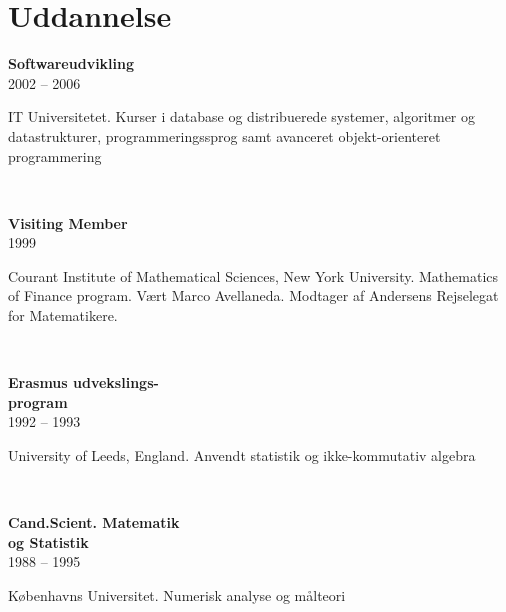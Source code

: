 \documentclass[10pt, a4paper]{article}
\begin{document}
\section{Uddannelse}
\begin{Row}%
  \begin{Cell}{1}
    \textbf{Softwareudvikling} \\[1ex]
    2002 -- 2006 %
  \end{Cell}
  \begin{Cell}{3}
    IT Universitetet. Kurser i database og distribuerede systemer, algoritmer og
    datastrukturer, programmeringssprog samt avanceret objekt-orienteret
    programmering
  \end{Cell}
\end{Row}
\\[0.5cm]
\begin{Row}%
  \begin{Cell}{1}
    \textbf{Visiting Member} \\[1ex]
    1999
  \end{Cell}
  \begin{Cell}{3}
    Courant Institute of Mathematical Sciences, New York University. Mathematics
    of Finance program. Vært Marco Avellaneda. Modtager af Andersens Rejselegat
    for Matematikere.
  \end{Cell}
\end{Row}
\\[0.5cm]
\begin{Row}%
  \begin{Cell}{1}
    \textbf{Erasmus udvekslings-\\ program} \\[1ex]
    1992 -- 1993 %
  \end{Cell}
  \begin{Cell}{3}
    University of Leeds, England. Anvendt statistik og ikke-kommutativ algebra
  \end{Cell}
\end{Row}
\\[0.5cm]
\begin{Row}%
  \begin{Cell}{1}
    \textbf{Cand.Scient. Matematik \\ og Statistik} \\[1ex]
    1988 -- 1995 %
  \end{Cell}
  \begin{Cell}{3}
    Københavns Universitet. Numerisk analyse og målteori
  \end{Cell}
\end{Row}
\end{document}
